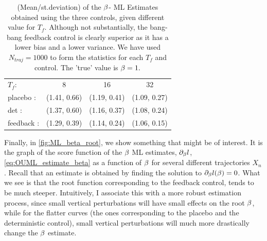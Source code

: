 \documentclass{article}
\begin{document}
\begin{table}
\begin{tabular}{l|ccc}
$T_f$:
 & 8
 & 16
 & 32
\\
placebo :
 & (1.41, 0.66)
 & (1.19, 0.41)
 & (1.09, 0.27)
\\
det :
 & (1.37, 0.60)
 & (1.16, 0.37)
 & (1.08, 0.24)
\\
feedback :
 & (1.29, 0.39)
 & (1.14, 0.24)
 & (1.06, 0.15)
\\
\end{tabular}
\caption{(Mean/st.deviation) of the ${\beta}$- ML Estimates obtained using the three
controls, given different value for $T_f$. Although not substantially, the
bang-bang feedback control is clearly superior as it has a lower bias and a
lower variance. We have used $N_{traj} = 1000$ to form the statistics for each
$T_f$ and control. The 'true' value is ${\beta} = 1.$}
\label{tab:OU_control_estimates_bang_bang_time_vs_space}
\end{table}


Finally, in \cref{fig:ML_beta_root}, we show something that might be of
interest. It is the graph of the score function of the ${\beta}$ ML estimates,
${\partial}_{\beta} l$, \cref{eq:OUML_estimate_beta} as a function of ${\beta}$ for several
different trajectories ${X_n}$. Recall that an estimate is obtained by finding
the solution to ${\partial}_{\beta} l({\beta}) = 0$. What we see is that the
root function corresponding to the feedback control, tends to be much steeper. Intuitively, I associate this
with a more robust estimation process, since small vertical perturbations will
have small effects on the root ${\beta}$, while for the flatter curves (the ones
corresponding to the placebo and the deterministic control), small vertical
perturbations will much more drastically change the ${\beta}$ estimate.
 
\end{document}
